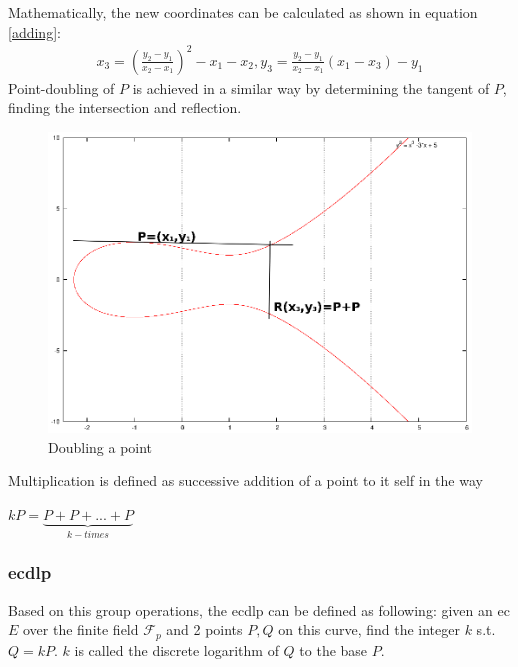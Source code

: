 Mathematically, the new coordinates can be calculated as shown in equation \ref{adding}:
\begin{align}\label{adding}
x_3 = (\frac{y_2-y_1}{x_2-x_1})^2-x_1-x_2, y_3=\frac{y_2-y_1}{x_2-x_1}(x_1-x_3)-y_1
\end{align}   
Point-doubling of $P$ is achieved in a similar way by determining the tangent of $P$, finding the intersection and reflection.
          \begin{figure}[H]
	    \centering
              \includegraphics[width=0.6\linewidth]{figures/doubleEC.eps}
              \caption{Doubling a point}
              \label{fig:ecDouble}
          \end{figure}
% 
% 
Multiplication is defined as successive addition of a point to it self in the way
\begin{center}
 $kP = \underbrace{P+P+...+P}_{k-times}$
\end{center}


\subsubsection{\gls{ecdlp}}\label{ecdp}

Based on this group operations, the \gls{ecdlp} \cite{ecdlp} can be defined as following: given an \gls{ec} $E$ over the finite field $\mathcal{F}_p$ and 2 points $P,Q$ on this curve, %
find the integer $k$ s.t. $Q = kP$. $k$ is called the discrete logarithm of $Q$ to the base $P$.

